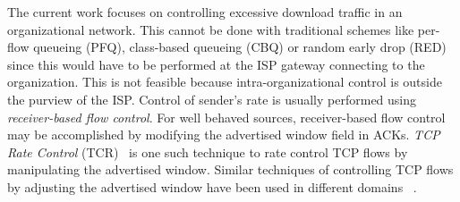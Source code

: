\documentclass[conference]{../../IEEEtran}
\begin{document}
The current work focuses on controlling excessive download traffic in an organizational network. This cannot be done with traditional schemes like per-flow queueing (PFQ), class-based queueing (CBQ) or random early drop (RED)~\cite{references:wei} since this would have to be performed at the ISP gateway connecting to the organization. This is not feasible because intra-organizational control is outside the purview of the ISP.  Control of sender's rate is usually performed using \emph{receiver-based flow control}. For well behaved sources, receiver-based flow control may be accomplished by modifying the advertised window field in ACKs. \emph{TCP Rate Control} (TCR)~\cite{references:karandikar} is one such technique to rate control TCP flows by manipulating the advertised window. Similar techniques of controlling TCP flows by adjusting the advertised window have been used in different domains ~\cite{references:kashibuchi}\cite{references:koga}\cite{references:palazzi10}\cite{references:packetshaper16}. 
\end{document}
